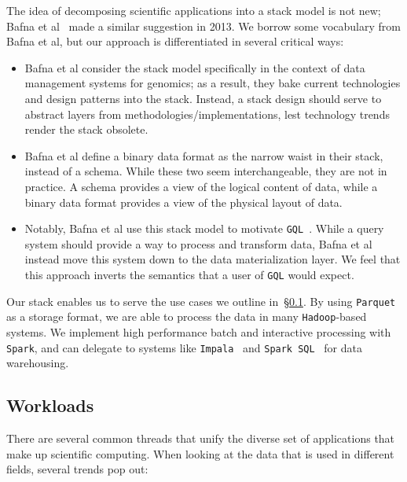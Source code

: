 \documentclass{sig-alternate}
\begin{document}
The idea of decomposing scientific applications into a stack model is not new; Bafna et al~\cite{bafna13}
made a similar suggestion in 2013. We borrow some vocabulary from Bafna et al, but our approach is
differentiated in several critical ways:

\begin{itemize}
\item Bafna et al consider the stack model specifically in the context of data management systems for
genomics; as a result, they bake current technologies and design patterns into the stack. Instead, a stack
design should serve to abstract layers from methodologies/implementations, lest technology trends render
the stack obsolete.
\item Bafna et al define a binary data format as the narrow waist in their stack, instead of a schema.
While these two seem interchangeable, they are not in practice. A schema provides a view of the logical content
of data, while a binary data format provides a view of the physical layout of data.
\item Notably, Bafna et al use this stack model to motivate \texttt{GQL}~\cite{kozanitis14}. While a query system
should provide a way to process and transform data, Bafna et al instead move this system down to the
data materialization layer. We feel that this approach inverts the semantics that a user of \texttt{GQL} would expect.
\end{itemize}

Our stack enables us to serve the use cases we outline in~\S\ref{sec:workloads}. By using
\texttt{Parquet} as a storage format, we are able to process the data in many \texttt{Hadoop}-based systems. We
implement high performance batch and interactive processing with \texttt{Spark}, and can delegate to
systems like \texttt{Impala}~\cite{kornacker15} and \texttt{Spark SQL}~\cite{armbrust15} for data warehousing.

\subsection{Workloads}
\label{sec:workloads}

There are several common threads that unify the diverse set of applications that make up scientific
computing. When looking at the data that is used in different fields, several trends pop out:
\end{document}
